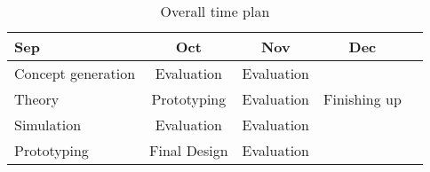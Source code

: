 



\begin{table}
    \caption{Overall time plan}
    \begin{tabular}{| l | c | c | c | c }
        \hline
        Sep & Oct & Nov & Dec \\
        \hline \hline
        Concept generation & Evaluation & Evaluation &  \\ 
        \hline
        Theory & Prototyping & Evaluation & Finishing up \\
        \hline
        Simulation & Evaluation & Evaluation & \\
        \hline
        Prototyping & Final Design & Evaluation &  \\
        \hline

    \end{tabular}
    \label{tab:overall_time_plan}
\end{table} 


